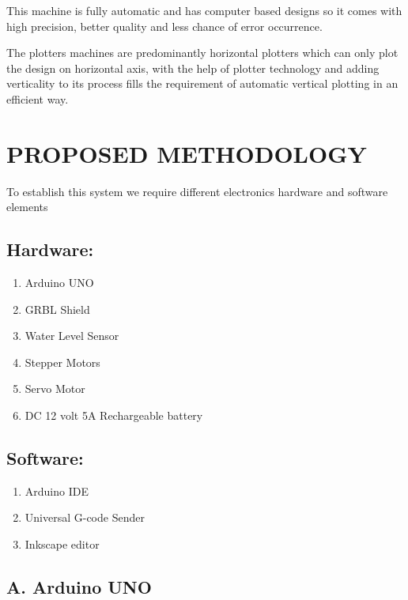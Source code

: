 \documentclass[conference]{IEEEtran}
\begin{document}
\vspace{12pt}

This machine is fully automatic and has computer based
designs so it comes with high precision, better quality and less
chance of error occurrence.

\vspace{12pt}

The plotters machines are predominantly horizontal plotters
which can only plot the design on horizontal axis, with the help
of plotter technology and adding verticality to its process fills
the requirement of automatic vertical plotting in an efficient
way.

\section{PROPOSED METHODOLOGY}
\vspace{12pt}
To establish this system we require different electronics
hardware and software elements

\vspace{12pt}

\subsection{Hardware:}
\begin{enumerate}
    \item Arduino UNO
    \item GRBL Shield
    \item Water Level Sensor
    \item Stepper Motors
    \item Servo Motor
    \item DC 12 volt 5A Rechargeable battery
\end{enumerate}
\subsection{Software:}
\begin{enumerate}
    \item Arduino IDE
    \item Universal G-code Sender
    \item Inkscape editor
\end{enumerate}


\clearpage


\subsection*{\textbf{A. Arduino UNO}}
\end{document}
